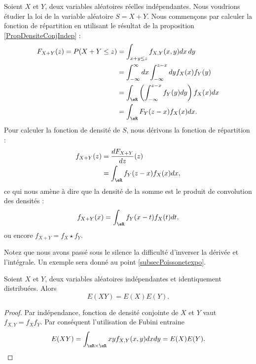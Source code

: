 Soient \( X\) et \( Y\), deux variables aléatoires réelles indépendantes. Nous voudrions étudier la loi de la variable aléatoire \( S=X+Y\). Nous commençons par calculer la fonction de répartition en utilisant le résultat de la proposition \ref{PropDensiteConjIndep} :
\begin{subequations}
    \begin{align}
        F_{X+Y}(z)=P(X+Y\leq z)&=\int_{x+y\leq z}f_{X,Y}(x,y)dx\,dy\\
        &=\int_{-\infty}^{\infty}dx\int_{-\infty}^{z-x}dyf_X(x)f_Y(y)\\
        &=\int_{\eR}\left( \int_{-\infty}^{z-x}f_Y(y)dy \right)f_X(x)dx\\
        &=\int_{\eR}F_Y(z-x)f_X(x)dx.
    \end{align}
\end{subequations}
Pour calculer la fonction de densité de \( S\), nous dérivons la fonction de répartition :
\begin{subequations}
    \begin{align}
        f_{X+Y}(z)&=\frac{ d F_{X+Y} }{ d z }(z)\\
        &=\int_{\eR}f_Y(z-x)f_X(x)dx,
    \end{align}
\end{subequations}
ce qui nous amène à dire que la densité de la somme est le produit de convolution des densités :
\begin{equation}        \label{EqdensitesooemXYint}
    f_{X+Y}(x)=\int_{\eR}f_Y(x-t)f_X(t)dt,
\end{equation}
ou encore \( f_{X+Y}=f_X\star f_Y\).

Notez que nous avons passé sous le silence la difficulté d'inverser la dérivée et l'intégrale. Un exemple sera donné au point \ref{subsecPoissonetexpo}.


\begin{lemma}       \label{LemEXYEXEYprodindep}
    Soient \( X\) et \( Y\), deux variables aléatoires indépendantes et identiquement distribuées. Alors
    \begin{equation}
        E(XY)=E(X)E(Y).
    \end{equation}
\end{lemma}

\begin{proof}
    Par indépendance, fonction de densité conjointe de \( X\) et \( Y\) vaut \( f_{X,Y}=f_Xf_Y\). Par conséquent l'utilisation de Fubini entraine
    \begin{equation}
        E(XY)=\int_{\eR\times\eR}xyf_{X,Y}(x,y)dxdy=E(X)E(Y).
    \end{equation}
\end{proof}

